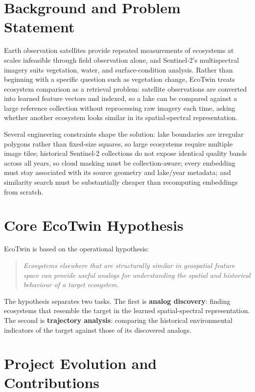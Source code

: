 \documentclass[12pt,a4paper,oneside]{report}
\begin{document}
\section{Background and Problem Statement}

Earth observation satellites provide repeated measurements of
ecosystems at scales infeasible through field observation alone, and
Sentinel-2's multispectral imagery suits vegetation, water, and
surface-condition analysis. Rather than beginning with a specific
question such as vegetation change, EcoTwin treats ecosystem
comparison as a retrieval problem: satellite observations are
converted into learned feature vectors and indexed, so a lake can be
compared against a large reference collection without reprocessing
raw imagery each time, asking whether another ecosystem looks
similar in its spatial-spectral representation.

Several engineering constraints shape the solution: lake boundaries
are irregular polygons rather than fixed-size squares, so large
ecosystems require multiple image tiles; historical Sentinel-2
collections do not expose identical quality bands across all years,
so cloud masking must be collection-aware; every embedding must stay
associated with its source geometry and lake/year metadata; and
similarity search must be substantially cheaper than recomputing
embeddings from scratch.

\section{Core EcoTwin Hypothesis}

EcoTwin is based on the operational hypothesis:

\begin{quote}
\emph{Ecosystems elsewhere that are structurally similar in
geospatial feature space can provide useful analogs for understanding
the spatial and historical behaviour of a target ecosystem.}
\end{quote}

The hypothesis separates two tasks. The first is \textbf{analog
discovery}: finding ecosystems that resemble the target in the
learned spatial-spectral representation. The second is
\textbf{trajectory analysis}: comparing the historical environmental
indicators of the target against those of its discovered analogs.

\section{Project Evolution and Contributions}
\end{document}
